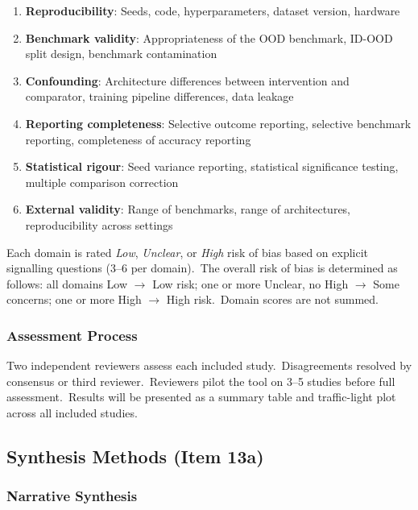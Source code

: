 \begin{enumerate}[nosep]
\item \textbf{Reproducibility}: Seeds, code, hyperparameters, dataset version, hardware
\item \textbf{Benchmark validity}: Appropriateness of the OOD benchmark, ID-OOD split design, benchmark contamination
\item \textbf{Confounding}: Architecture differences between intervention and comparator, training pipeline differences, data leakage
\item \textbf{Reporting completeness}: Selective outcome reporting, selective benchmark reporting, completeness of accuracy reporting
\item \textbf{Statistical rigour}: Seed variance reporting, statistical significance testing, multiple comparison correction
\item \textbf{External validity}: Range of benchmarks, range of architectures, reproducibility across settings
\end{enumerate}

Each domain is rated \textit{Low}, \textit{Unclear}, or \textit{High} risk of bias based on explicit signalling questions (3--6 per domain).\ The overall risk of bias is determined as follows: all domains Low $\rightarrow$ Low risk; one or more Unclear, no High $\rightarrow$ Some concerns; one or more High $\rightarrow$ High risk.\ Domain scores are not summed.

\subsubsection{Assessment Process}

Two independent reviewers assess each included study.\ Disagreements resolved by consensus or third reviewer.\ Reviewers pilot the tool on 3--5 studies before full assessment.\ Results will be presented as a summary table and traffic-light plot across all included studies.

\subsection{Synthesis Methods (Item 13a)}

\subsubsection{Narrative Synthesis}

